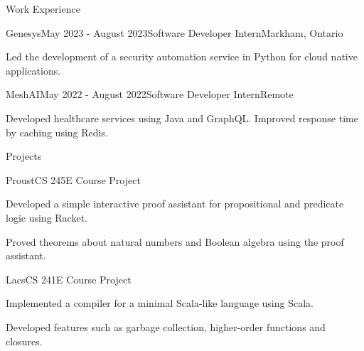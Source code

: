 \documentclass[
	12pt, %
]{resume} %
\begin{document}
\begin{rSection}{Work Experience}

	\begin{rSubsection}{Genesys}{May 2023 - August 2023}{Software Developer Intern}{Markham, Ontario}
		\item Led the development of a security automation service in Python for cloud native applications.
	\end{rSubsection}


	\begin{rSubsection}{MeshAI}{May 2022 - August 2022}{Software Developer Intern}{Remote}
		\item Developed healthcare services using Java and GraphQL. Improved response time by caching using Redis.
	\end{rSubsection}



\end{rSection}

\begin{rSection}{Projects}
     \begin{rSubsection}{Proust}{CS 245E Course Project}{}{}
        \item Developed a simple interactive proof assistant for propositional and predicate logic using Racket.
        \item Proved theorems about natural numbers and Boolean algebra using the proof assistant.
     \end{rSubsection}
     \begin{rSubsection}{Lacs}{CS 241E Course Project}{}{}
		\item Implemented a compiler for a minimal Scala-like language using Scala.
        \item Developed features such as garbage collection, higher-order functions and closures.
	\end{rSubsection}
\end{rSection}
\end{document}
